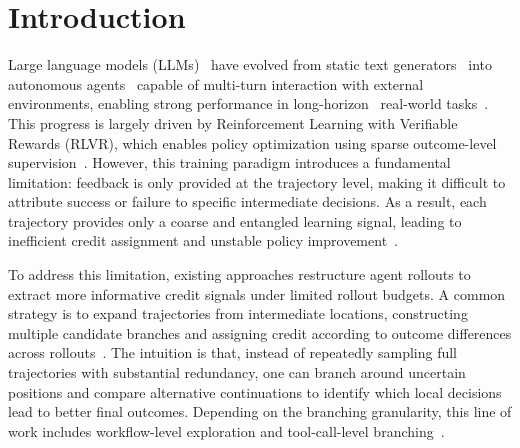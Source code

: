 \documentclass{article}
\begin{document}
\section{Introduction}
Large language models (LLMs)~\cite{wei2022chain,jaech2024openai,team2025kimi1,team2025kimi,team2025longcat,yang2025qwen3,li2025system} have evolved from static text generators~\cite{radford2019language} into autonomous agents~\cite{wang2025toward,zhang2025landscape,dong2025agentic,feng2025retool,ma2026skillclaw} capable of multi-turn interaction with external environments, enabling strong performance in long-horizon~\cite{lu2025pilotrl,gao2025beyond} real-world tasks~\cite{hafner2021benchmarking,cao2025skyrl,shridhar2020alfworld,yao2022webshop}. 
This progress is largely driven by Reinforcement Learning with Verifiable Rewards (RLVR), which enables policy optimization using sparse outcome-level supervision~\cite{guo2025deepseek,schulman2017proximal,lee2023rlaif,rafailov2023direct,shao2024deepseekmath,chu2026gpg}. 
However, this training paradigm introduces a fundamental limitation: feedback is only provided at the trajectory level, making it difficult to attribute success or failure to specific intermediate decisions. As a result, each trajectory provides only a coarse and entangled learning signal, leading to inefficient credit assignment and unstable policy improvement~\cite{qian2025smart,feng2025group,hou2025treerl,ji2025tree}.


To address this limitation, existing approaches restructure agent rollouts to extract more informative credit signals under limited rollout budgets. A common strategy is to expand trajectories from intermediate locations, constructing multiple candidate branches and assigning credit according to outcome differences across rollouts~\cite{yao2022react,zhou2023language,ji2025tree,zhao2026training,shen2025carl}. The intuition is that, instead of repeatedly sampling full trajectories with substantial redundancy, one can branch around uncertain positions and compare alternative continuations to identify which local decisions lead to better final outcomes. Depending on the branching granularity, this line of work includes workflow-level exploration and tool-call-level branching~\cite{hou2025treerl,dong2025agentic,dong2025agentic1,li2025deepagent}.  
\end{document}
